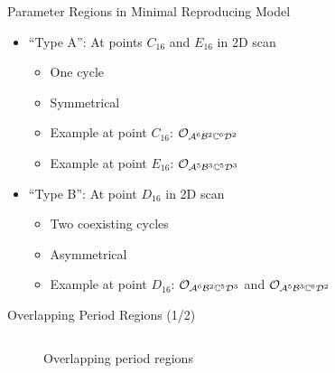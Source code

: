 \begin{frame}{Parameter Regions in Minimal Reproducing Model}
    \begin{itemize}
        \item ``Type A'': At points $C_{16}$ and $E_{16}$ in 2D scan
              \begin{itemize}
                  \item One cycle
                  \item Symmetrical
                  \item Example at point $C_{16}$: $\mathcal{O}_{\mathcal{A}^6\mathcal{B}^2\mathbb{C}^6\mathcal{D}^2}$
                  \item Example at point $E_{16}$: $\mathcal{O}_{\mathcal{A}^5\mathcal{B}^3\mathbb{C}^5\mathcal{D}^3}$ \vspace*{1em}
              \end{itemize}
        \item ``Type B'': At point $D_{16}$ in 2D scan
              \begin{itemize}
                  \item Two coexisting cycles
                  \item Asymmetrical
                  \item Example at point $D_{16}$: $\mathcal{O}_{\mathcal{A}^6\mathcal{B}^2\mathbb{C}^5\mathcal{D}^3}$ and $\mathcal{O}_{\mathcal{A}^5\mathcal{B}^3\mathbb{C}^6\mathcal{D}^2}$
              \end{itemize}
    \end{itemize}
\end{frame}

\begin{frame}{Overlapping Period Regions (1/2)}
    \vspace{-1em}
    \begin{columns}
        \begin{column}{.8 \textwidth}
            \vspace{-3em}
            \begin{figure}
                \centering
                \caption*{Overlapping period regions}
            \end{figure}
        \end{column}
        \begin{column}{.2 \textwidth}
            \vspace{-4em}
            \begin{figure}
            \end{figure}
        \end{column}
    \end{columns}
\end{frame}

